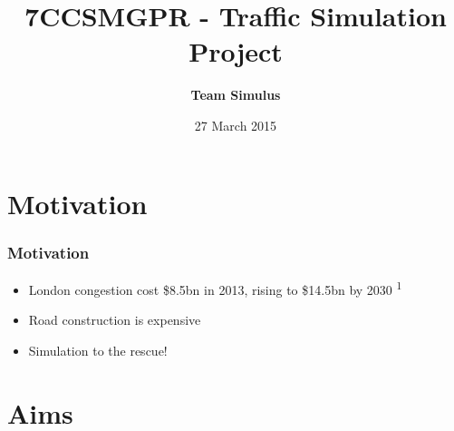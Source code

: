 \documentclass{beamer}
\title[Welcome]{7CCSMGPR - Traffic Simulation Project} %
\author{\textbf{Team Simulus}} %
\institute[KCL] %
{
King's College London \\ %
\medskip
\textit{https://github.com/leorohr/simulus} %
}
\date{27 March 2015} %
\begin{document}
\begin{frame}
\titlepage %
\end{frame}





\section{Motivation}

\begin{frame}
\frametitle{Motivation}

\begin{itemize}
	\item London congestion cost \$8.5bn in 2013, rising to \$14.5bn by 2030 \textsuperscript{1}
	\item Road construction is expensive
	\item Simulation to the rescue!
\end{itemize}

\end{frame}


\section{Aims}
\end{document}
